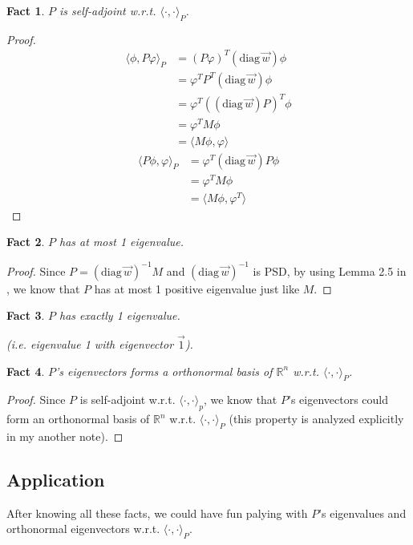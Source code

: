 \documentclass{article}
\newtheorem{fact}{Fact}[section]
\def\diag#1{(\mathrm{diag}\,#1)}
\def\<{\langle}
\def\>{\rangle}
\begin{document}
\begin{fact}
  $P$ is self-adjoint w.r.t. $\<\cdot, \cdot\>_P$.
\end{fact}
\begin{proof}
  \begin{align*}
    \<\phi, P\varphi\>_P
    &= (P\varphi)^T\diag{\vec{w}}\phi \\
    &= \varphi^TP^T\diag{\vec{w}}\phi \\
    &= \varphi^T(\diag{\vec{w}}P)^T\phi \\
    &= \varphi^TM\phi\\
    &= \<M\phi, \varphi\>
  \end{align*}
  \begin{align*}
    \<P\phi, \varphi\>_P
    &= \varphi^T \diag{\vec{w}}P\phi \\
    &= \varphi^T M\phi \\
    &= \<M\phi, \varphi^T\>
  \end{align*}
\end{proof}

\begin{fact}
  $P$ has at most 1 eigenvalue.
\end{fact}
\begin{proof}
Since $P = \diag{\vec{w}}^{-1} M$ and $\diag{\vec{w}}^{-1}$ is PSD, by using Lemma 2.5 in \cite{anari2019log}, we know that $P$ has at most 1 positive eigenvalue just like $M$.
\end{proof}

\begin{fact}
  $P$ has exactly 1 eigenvalue.
  
  (i.e. eigenvalue 1 with eigenvector $\vec{1}$).
\end{fact}

\begin{fact}
  $P$'s eigenvectors forms a orthonormal basis of $\mathbb{R}^n$ w.r.t. $\<\cdot, \cdot\>_P$.
\end{fact}
\begin{proof}
Since $P$ is self-adjoint w.r.t. $\<\cdot, \cdot\>_p$, we know that $P$'s eigenvectors could form an orthonormal basis of $\mathbb{R}^n$ w.r.t. $\<\cdot, \cdot\>_P$ (this property is analyzed explicitly in my another note).
\end{proof}

\subsection{Application}
After knowing all these facts, we could have fun palying with $P$'s eigenvalues and orthonormal eigenvectors w.r.t. $\<\cdot, \cdot\>_P$.
\end{document}
